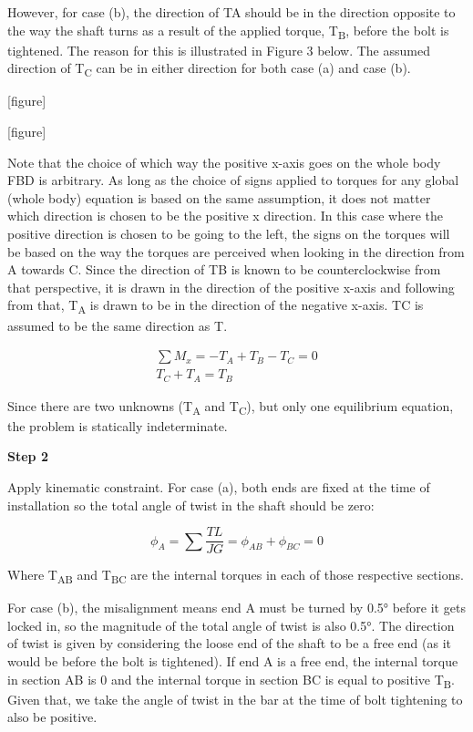 \documentclass[
  letterpaper,
  DIV=11,
  numbers=noendperiod]{scrreprt}
\theoremstyle{definition}
\theoremstyle{remark}
\begin{document}
\begin{tcolorbox}
\begin{tcolorbox}
However, for case (b), the direction of TA should be in the direction
opposite to the way the shaft turns as a result of the applied torque,
T\textsubscript{B}, before the bolt is tightened. The reason for this is
illustrated in Figure 3 below. The assumed direction of
T\textsubscript{C} can be in either direction for both case (a) and case
(b).

{[}figure{]}

{[}figure{]}

Note that the choice of which way the positive x-axis goes on the whole
body FBD is arbitrary. As long as the choice of signs applied to torques
for any global (whole body) equation is based on the same assumption, it
does not matter which direction is chosen to be the positive x
direction. In this case where the positive direction is chosen to be
going to the left, the signs on the torques will be based on the way the
torques are perceived when looking in the direction from A towards C.
Since the direction of TB is known to be counterclockwise from that
perspective, it is drawn in the direction of the positive x-axis and
following from that, T\textsubscript{A} is drawn to be in the direction
of the negative x-axis. TC is assumed to be the same direction as T.

\[
\begin{gathered}
\sum M_x=-T_A+T_B-T_C=0 \\
T_C+T_A=T_B
\end{gathered}
\]

Since there are two unknowns (T\textsubscript{A} and
T\textsubscript{C}), but only one equilibrium equation, the problem is
statically indeterminate.

\textbf{Step 2}

Apply kinematic constraint. For case (a), both ends are fixed at the
time of installation so the total angle of twist in the shaft should be
zero:

\[
\phi_A=\sum \frac{T L}{J G}=\phi_{A B}+\phi_{B C}=0
\]

Where T\textsubscript{AB} and T\textsubscript{BC} are the internal
torques in each of those respective sections.

For case (b), the misalignment means end A must be turned by 0.5° before
it gets locked in, so the magnitude of the total angle of twist is also
0.5°. The direction of twist is given by considering the loose end of
the shaft to be a free end (as it would be before the bolt is
tightened). If end A is a free end, the internal torque in section AB is
0 and the internal torque in section BC is equal to positive
T\textsubscript{B}. Given that, we take the angle of twist in the bar at
the time of bolt tightening to also be positive.


\end{tcolorbox}
\end{tcolorbox}
\end{document}
